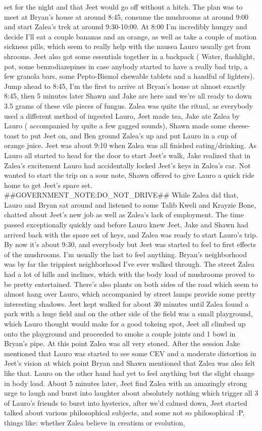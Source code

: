 \documentclass[12pt]{book}
\begin{document}
set for the night and that Jeet would go off without a hitch. The plan was to meet at Bryan's house at around 8:45, consume the mushrooms at around 9:00 and start Zalea's trek at around 9:30-10:00. At 8:00 I'm incredibly hungry and decide I'll eat a couple bananas and an orange, as well as take a couple of motion sickness pills, which seem to really help with the nausea Lauro usually get from shrooms. Jeet also got some essentials together in a backpack ( Water, flashlight, pot, some benzodiazepines in case anybody started to have a really bad trip, a few granola bars, some Pepto-Bismol chewable tablets and a handful of lighters). Jump ahead to 8:45, I'm the first to arrive at Bryan's house at almost exactly 8:45, then 5 minutes later Shawn and Jake are here and we're all ready to down 3.5 grams of these vile pieces of fungus. Zalea was quite the ritual, as everybody used a different method of ingested Lauro, Jeet made tea, Jake ate Zalea by Lauro ( accompanied by quite a few gagged sounds), Shawn made some cheese-toast to put Jeet on, and Ben ground Zalea's up and put Lauro in a cup of orange juice. Jeet was about 9:10 when Zalea was all finished eating/drinking. As Lauro all started to head for the door to start Jeet's walk, Jake realized that in Zalea's excitement Lauro had accidentally locked Jeet's keys in Zalea's car. Not wanted to start the trip on a sour note, Shawn offered to give Lauro a quick ride home to get Jeet's spare set. \#\#GOVERNMENT\_NOTE:DO\_NOT\_DRIVE\#\# While Zalea did that, Lauro and Bryan sat around and listened to some Talib Kweli and Krayzie Bone, chatted about Jeet's new job as well as Zalea's lack of employment. The time passed exceptionally quickly and before Lauro knew Jeet, Jake and Shawn had arrived back with the spare set of keys, and Zalea was ready to start Lauro's trip. By now it's about 9:30, and everybody but Jeet was started to feel to first effects of the mushrooms. I'm usually the last to feel anything. Bryan's neighborhood was by far the trippiest neighborhood I've ever walked through. The street Zalea had a lot of hills and inclines, which with the body load of mushrooms proved to be pretty entertained. There's also plants on both sides of the road which seem to almost hang over Lauro, which accompanied by street lamps provide some pretty interesting shadows. Jeet kept walked for about 30 minutes until Zalea found a park with a huge field and on the other side of the field was a small playground, which Lauro thought would make for a good tokeing spot, Jeet all climbed up onto the playground and proceeded to smoke a couple joints and 1 bowl in Bryan's pipe. At this point Zalea was all very stoned. After the session Jake mentioned that Lauro was started to see some CEV and a moderate distortion in Jeet's vision at which point Bryan and Shawn mentioned that Zalea was also felt like that. Lauro on the other hand had yet to feel anything but the slight change in body load. About 5 minutes later, Jeet find Zalea with an amazingly strong urge to laugh and burst into laughter about absolutely nothing which trigger all 3 of Lauro's friends to burst into hysterics, after we'd calmed down, Jeet started talked about various philosophical subjects, and some not so philosophical :P, things like: whether Zalea believe in creatism or evolution, 
\end{document}
